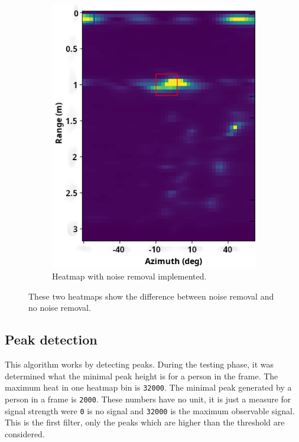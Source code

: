 \begin{figure}[t]
\begin{subfigure}{.45\textwidth}
  \includegraphics[width=.9\linewidth]{figures/people_detection/heatmap_with_filtering_crop_axis.png}  
  \caption{Heatmap with noise removal implemented.}
  \label{fig:noise_removal}
\end{subfigure}
\caption{These two heatmaps show the difference between noise removal and no noise removal.}
\label{fig:noise_vs_no_noise}
\end{figure}

\subsection{Peak detection}
This algorithm works by detecting peaks. During the testing phase, it was determined what the minimal peak height is for a person in the frame. The maximum heat in one heatmap bin is \texttt{32000}. The minimal peak generated by a person in a frame is \texttt{2000}. These numbers have no unit, it is just a measure for signal strength were \texttt{0} is no signal and \texttt{32000} is the maximum observable signal. This is the first filter, only the peaks which are higher than the threshold are considered.


